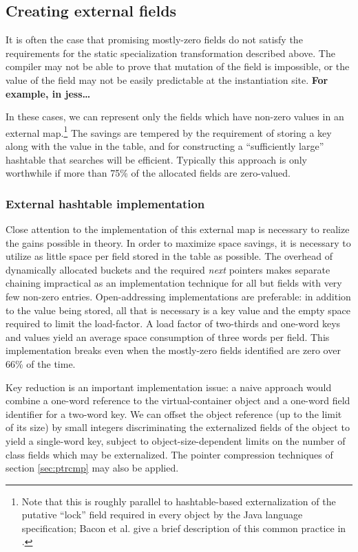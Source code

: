 \documentclass[preprint]{acmconf}
\begin{document}
\subsection{Creating external fields}
It is often the case that promising mostly-zero fields do not satisfy
the requirements for the static specialization transformation
described above.  The compiler may not be able to prove that mutation
of the field is impossible, or the value of the field may not be
easily predictable at the instantiation site.
{\bf For example, in jess\ldots } %

In these cases, we can represent only the fields which have non-zero
values in an external map.\footnote{Note that this is roughly parallel
  to hashtable-based externalization of the putative ``lock'' field
  required in every object by the Java language specification; Bacon
  et al. give a brief description of this common
  practice in \cite{bacon98}.}
The savings are tempered by the requirement of storing a key along
with the value in the table, and for constructing a ``sufficiently
large'' hashtable that searches will be efficient.  Typically this
approach is only worthwhile if more than 75\% of the allocated fields
are zero-valued.

\subsubsection{External hashtable implementation}
Close attention to the implementation of this external map is
necessary to realize the gains possible in theory.  In order to
maximize space savings, it is necessary to utilize as little space
per field stored in the table as possible.  The overhead of
dynamically allocated buckets and the required {\it next} pointers
makes separate chaining impractical as an implementation technique
for all but fields with very few non-zero entries.  Open-addressing
implementations are preferable: in addition to the value being stored,
all that is necessary is a key value and the empty space required to
limit the load-factor.  A load factor of two-thirds and one-word keys
and values yield an average space consumption of three words per
field.  This implementation breaks even when the mostly-zero fields
identified are zero over 66\% of the time.

Key reduction is an important implementation issue: a naive approach
would combine a one-word reference to the virtual-container object and a
one-word field identifier for a two-word key.  We can offset the
object reference (up to the limit of its size) by small integers
discriminating the externalized fields of the object to yield a
single-word key, subject to object-size-dependent limits on the number
of class fields which may be externalized.  The pointer compression
techniques of section \ref{sec:ptrcmp} may also be applied.
\end{document}
